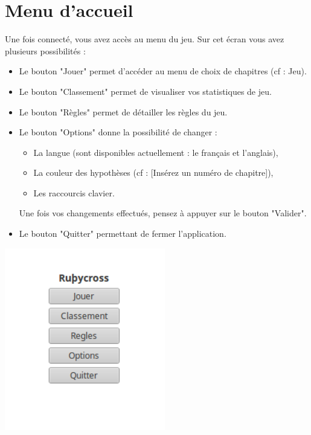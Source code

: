 \documentclass[a4paper, 12pt]{report}
\begin{document}
	\section{Menu d'accueil}

	    Une fois connecté, vous avez accès au menu du jeu. Sur cet écran vous avez plusieurs possibilités :
	    \begin{itemize}
            \item Le bouton "Jouer" permet d'accéder au menu de choix de chapitres (cf : Jeu).
            \item Le bouton "Classement" permet de visualiser vos statistiques de jeu.
            \item Le bouton "Règles" permet de détailler les règles du jeu.
            \item Le bouton "Options" donne la possibilité de changer :
            \begin{itemize}
                \item La langue (sont disponibles actuellement : le français et l'anglais),
                \item La couleur des hypothèses (cf : [Insérez un numéro de chapitre]),
                \item Les raccourcis clavier.
            \end{itemize}
            Une fois vos changements effectués, pensez à appuyer sur le bouton "Valider".
            \item Le bouton "Quitter" permettant de fermer l'application.
        \end{itemize}

        \begin{minipage}{\linewidth}
                    \centering
			        \includegraphics[width=7cm]{screenMenuJeu.png}
	    \end{minipage}
\end{document}
